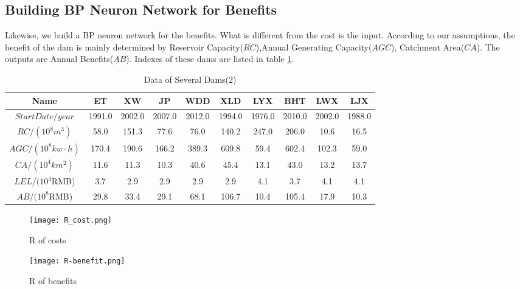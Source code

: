 \documentclass[12pt]{article}%
\begin{document}
\subsection{Building BP Neuron Network for Benefits}
Likewise, we build a BP neuron network for the benefits. What is different from the cost is the input. According to our assumptions, the benefit of the dam is mainly determined by Reservoir Capacity($RC$),Annual Generating Capacity($AGC$), Catchment Area($CA$). The outputs are Annual Benefits($AB$). Indexes of these dams are listed in table \ref{benefit}. 
\begin{table}[H]
\footnotesize
\centering  
\caption{ Data of Several Dams(2)}
\label{benefit}
\begin{tabular}{|cccccccccc|}
\hline
Name  &  ET  &  XW  &  JP  &  WDD  &  XLD  &  LYX  &  BHT  &  LWX  &  LJX\\
\hline
$StartDate/year$  &  1991.0  &  2002.0  &  2007.0  &  2012.0  &  1994.0  &  1976.0  &  2010.0  &  2002.0  &  1988.0\\
\hline
$RC/(10^8 m^3)$  &  58.0  &  151.3  &  77.6  &  76.0  &  140.2  &  247.0  &  206.0  &  10.6  &  16.5\\
\hline
$AGC/(10^8kw\cdot h)$  &  170.4  &  190.6  &  166.2  &  389.3  &  609.8  &  59.4  &  602.4  &  102.3  &  59.0\\
\hline
$CA/(10^4 km^2)$  &  11.6  &  11.3  &  10.3  &  40.6  &  45.4  &  13.1  &  43.0  &  13.2  &  13.7\\
\hline
$LEL/(10^4$RMB)  &  3.7  &  2.9  &  2.9  &  2.9  &  2.9  &  4.1  &  3.7  &  4.1  &  4.1\\
\hline
$AB/(10^8$RMB)  &  29.8  &  33.4  &  29.1  &  68.1  &  106.7  &  10.4  &  105.4  &  17.9  &  10.3\\
\hline
\end{tabular}
\end{table}
	\begin{figure}[H]
		\begin{minipage}[t]{0.45\linewidth}
		\centering
		\texttt{[image: R\_cost.png]}
		\caption{R of costs}
		\label{R-cost}
		\end{minipage}
		\begin{minipage}[t]{0.45\linewidth}
		\centering
		\texttt{[image: R-benefit.png]}
		\caption{R of benefits}
		\label{R-benefit}
		\end{minipage}
	\end{figure}
\end{document}
